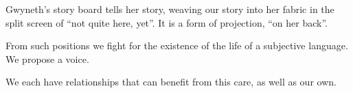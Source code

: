 

Gwyneth's story board tells her story, weaving our story into her
fabric in the split screen of ``not quite here, yet''.  It is a form
of projection, ``on her back''.  

From such positions we fight for the existence of the life of a
subjective language.  We propose a voice.

We each have relationships that can benefit from this care, as well as
our own.

\bye
